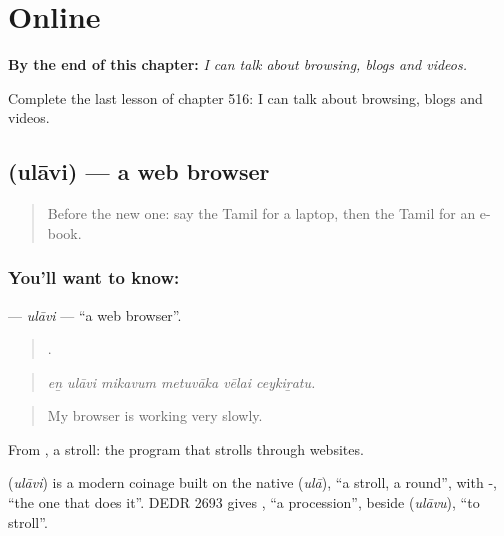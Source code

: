 
\chapter{Online}
\label{ch:ta-online}

\begin{chapteropening}
\textbf{By the end of this chapter:} \emph{I can talk about browsing, blogs and videos.}

Complete the last lesson of chapter 516: I can talk about browsing, blogs and videos.
\end{chapteropening}

\section[\texorpdfstring{\ta{உலாவி} (ulāvi)}{உலாவி (ulāvi)}]{ (ulāvi) — a web browser}

\label{lesson:TA-C516-ulavi}



\begin{quote}
Before the new one: say the Tamil for a laptop, then the Tamil for an e-book.
\end{quote}

\subsection*{You'll want to know: }
\textbf{} — \emph{ulāvi} — \textquotedblleft{}a web browser\textquotedblright{}.

\begin{quote}
     .
\end{quote}

\begin{quote}
\emph{eṉ ulāvi mikavum metuvāka vēlai ceykiṟatu.}
\end{quote}

\begin{quote}
My browser is working very slowly.
\end{quote}

From , a stroll: the program that strolls through websites.

\begin{cousinweb}
\textbf{} (\emph{ulāvi}) is a modern coinage built on the native  (\emph{ulā}), \textquotedblleft{}a stroll, a round\textquotedblright{}, with -, \textquotedblleft{}the one that does it\textquotedblright{}. DEDR 2693 gives , \textquotedblleft{}a procession\textquotedblright{}, beside  (\emph{ulāvu}), \textquotedblleft{}to stroll\textquotedblright{}.
\end{cousinweb}

